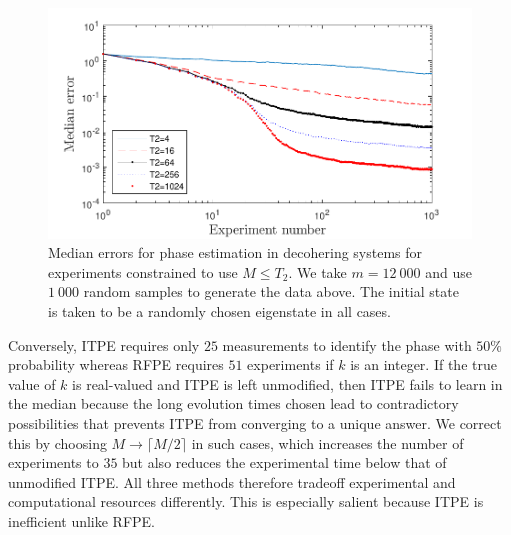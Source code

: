\documentclass[aps,pra,amsmath,twocolumn,amssymb,superscriptaddress]{revtex4-1}
\begin{document}
\begin{figure}[t!]
    \begin{centering}
\includegraphics[width=0.95\linewidth]{T2plot_full.pdf}
    \end{centering}
    \caption{\label{fig:T2plot}
Median errors for phase estimation in decohering systems for experiments constrained to use $M\le T_2$.  We take $m=12~000$ and use $1~000$ random samples to generate the data above.  The initial state is taken to be a randomly chosen eigenstate in all cases.
    }
\end{figure}
Conversely,
ITPE requires only $25$ measurements to identify the phase with $50\%$
probability whereas RFPE requires $51$ experiments if $k$ is an integer.  If
the true value of $k$ is real-valued and ITPE is left unmodified, then  ITPE
fails to learn in the median because the long evolution times chosen lead to
contradictory possibilities that prevents ITPE from converging to a unique answer.  We correct
this by choosing $M\rightarrow \lceil M/2\rceil$ in such cases, which increases the number
of experiments to $35$ but also reduces the experimental time below that of
unmodified ITPE.  All three methods therefore
tradeoff experimental and computational resources differently.  This is especially salient because ITPE is inefficient unlike RFPE.
\end{document}
